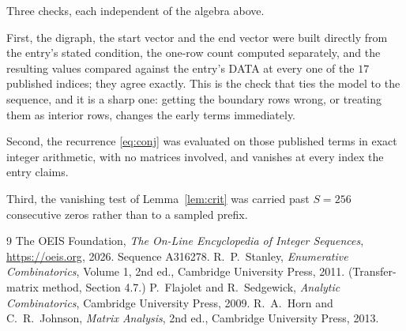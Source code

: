 \documentclass[11pt,a4paper]{article}
\theoremstyle{plain}
\theoremstyle{definition}
\begin{document}
Three checks, each independent of the algebra above.

First, the digraph, the start vector and the end vector were built directly from the
entry's stated condition, the one-row count computed separately, and the resulting values
compared against the entry's DATA at every one of the $17$ published indices; they
agree exactly. This is the check that ties the model to the sequence, and it is a sharp one:
getting the boundary rows wrong, or treating them as interior rows, changes the early terms
immediately.

Second, the recurrence \eqref{eq:conj} was evaluated on those published terms in exact
integer arithmetic, with no matrices involved, and vanishes at every index the entry claims.

Third, the vanishing test of Lemma~\ref{lem:crit} was carried past $S=256$ consecutive
zeros rather than to a sampled prefix.

\begin{thebibliography}{9}
 The OEIS Foundation, \emph{The On-Line Encyclopedia of Integer
Sequences}, \url{https://oeis.org}, 2026. Sequence A316278.
 R.~P.~Stanley, \emph{Enumerative Combinatorics}, Volume 1, 2nd ed.,
Cambridge University Press, 2011. (Transfer-matrix method, Section 4.7.)
 P.~Flajolet and R.~Sedgewick, \emph{Analytic Combinatorics}, Cambridge
University Press, 2009.
 R.~A.~Horn and C.~R.~Johnson, \emph{Matrix Analysis}, 2nd ed., Cambridge
University Press, 2013.
\end{thebibliography}
\end{document}
